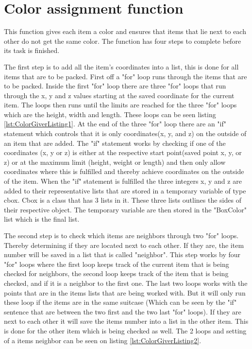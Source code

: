 \section{Color assignment function}
\label{sec:ColorGiver}
This function gives each item a color and ensures that items that lie next to each other do not get the same color. The function has four steps to complete before its task is finished.

The first step is to add all the item's coordinates into a list, this is done for all items that are to be packed. First off a "for" loop runs through the items that are to be packed. Inside the first "for" loop there are three "for" loops that run through the x, y and z values starting at the saved coordinate for the current item. The loops then runs until the limits are reached for the three "for" loops which are the height, width and length. These loops can be seen listing \ref{lst:ColorGiverListing1}. At the end of the three "for" loop there are an "if" statement which controls that it is only coordinates(x, y, and z) on the outside of an item that are added. The "if" statement works by checking if one of the coordinates (x, y or z) is either at the respective start point(saved point x, y, or z) or at the maximum limit (height, weight or length) and then only allow coordinates where this is fulfilled and thereby achieve coordinates on the outside of the item.
When the "if" statement is fulfilled the three integers x, y and z are added to their representative lists that are stored in a temporary variable of type cbox. Cbox is a class that has 3 lists in it. These three lists outlines the sides of their respective object. The temporary variable are then stored in the "BoxColor" list which is the final list.

The second step is to check which items are neighbors through two "for" loops. Thereby determining if they are located next to each other. If they are, the item number will be saved in a list that is called "neighbor". This step works by four "for" loops where the first loop keeps track of the current item that is being checked for neighbors, the second loop keeps track of the item that is being checked, and if it is a neighbor to the first one. The last two loops works with the points that are in the items lists that are being worked with. But it will only run these loop if the items are in the same suitcase (Which can be seen by the "if" sentence that are between the two first and the two last "for" loops). If they are next to each other it will save the items number into a list in the other item. This is done for the other item which is being checked as well. The 2 loops and setting of a items neighbor can be seen on listing \ref{lst:ColorGiverListing2}.

